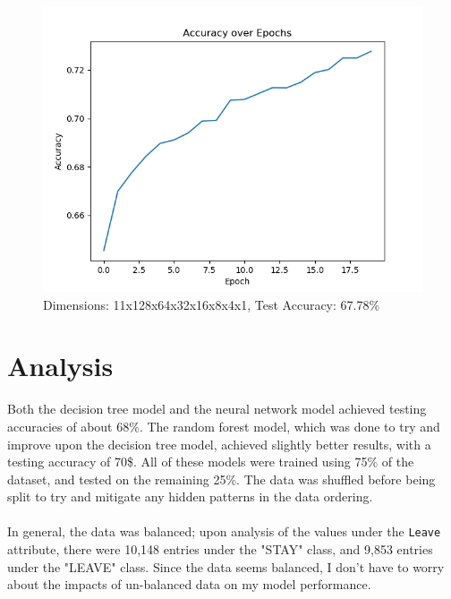 \documentclass[12pt, notitlepage]{article}
\begin{document}
\begin{figure}[H]
	\centering
	\includegraphics[scale=0.6]{neuralnet3.png}
	\caption{Dimensions: 11x128x64x32x16x8x4x1, Test Accuracy: 67.78\%}
\end{figure}

\section{Analysis}
Both the decision tree model and the neural network model achieved testing accuracies of about 68\%. The random forest model, which was done to try and improve upon the decision tree model, achieved slightly better results, with a testing accuracy of 70\$. All of these models were trained using 75\% of the dataset, and tested on the remaining 25\%. The data was shuffled before being split to try and mitigate any hidden patterns in the data ordering. \\\\
In general, the data was balanced; upon analysis of the values under the \texttt{Leave} attribute, there were 10,148 entries under the "STAY" class, and 9,853 entries under the "LEAVE" class. Since the data seems balanced, I don't have to worry about the impacts of un-balanced data on my model performance.\\\\
\end{document}

